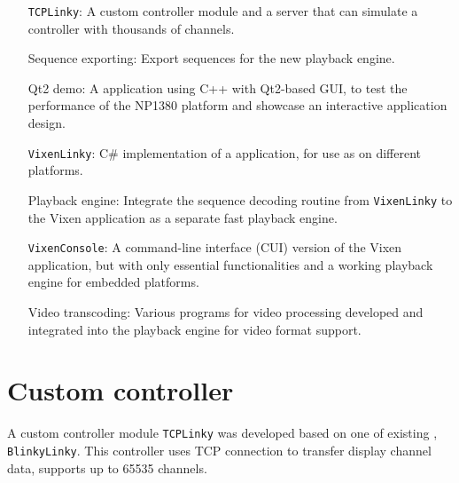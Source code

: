\renewcommand{\baselinestretch}{\mystretch}
\label{chap:Impl}

 

\begin{enumerate}[noitemsep,leftmargin=4cm]
  \item[\texttt{TCPLinky}:] A custom controller module and a server that can simulate a  controller with thousands of channels.
  \item[Sequence exporting:] Export sequences for the new playback engine.
  \item[Qt2 demo:] A  application using C++ with Qt2-based GUI, to test the performance of the NP1380 platform and showcase an interactive application design.
  \item[\texttt{VixenLinky}:] C\# implementation of a  application, for use as    on different platforms.
  \item[Playback engine:] Integrate the sequence decoding routine from \texttt{VixenLinky} to the Vixen application as a separate fast playback engine.
  \item[\texttt{VixenConsole}:] A command-line interface (CUI) version of the Vixen application, but with only essential functionalities and a working playback engine for embedded platforms.
  \item[Video transcoding:] Various programs for video processing  developed and integrated into the playback engine for video format support.
\end{enumerate}

\newpage

\section{Custom controller}
\label{sec:tcplinky}

A custom controller module  \texttt{TCPLinky} was developed based on one of  existing , \texttt{BlinkyLinky}. This controller uses  TCP connection to transfer display channel data,  supports up to 65535 channels.

